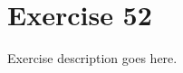 \section{Exercise 52}
\begin{question}
   Exercise description goes here. 
\end{question}

\begin{solution}
\end{solution}
